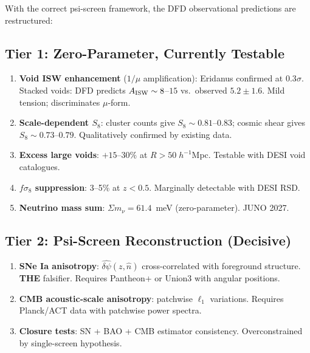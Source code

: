 \documentclass[11pt,a4paper]{article}
\newcounter{findingctr}
\newenvironment{finding}[1][]{%
  \refstepcounter{findingctr}%
  \begin{tcolorbox}[colback=blue!3!white, colframe=blue!50!black,
    title=\textbf{Finding \thefindingctr: #1}]
}{%
  \end{tcolorbox}%
}
\newcommand{\mufd}{\mu}
\begin{document}
\begin{finding}[\textbf{Revised Prediction Hierarchy}]
\label{find:strategy}

With the correct psi-screen framework, the DFD observational
predictions are restructured:

\subsection*{Tier 1: Zero-Parameter, Currently Testable}

\begin{enumerate}
\item \textbf{Void ISW enhancement} ($1/\mufd$ amplification):
  Eridanus confirmed at $0.3\sigma$.  Stacked voids: DFD predicts
  $A_{\rm ISW} \sim 8$--$15$ vs.\ observed $5.2 \pm 1.6$.
  Mild tension; discriminates $\mufd$-form.

\item \textbf{Scale-dependent $S_8$}: cluster counts give
  $S_8 \sim 0.81$--$0.83$; cosmic shear gives $S_8 \sim 0.73$--$0.79$.
  Qualitatively confirmed by existing data.

\item \textbf{Excess large voids}: $+15$--$30\%$ at $R > 50\;h^{-1}$Mpc.
  Testable with DESI void catalogues.

\item \textbf{$f\sigma_8$ suppression}: 3--5\% at $z < 0.5$.
  Marginally detectable with DESI RSD.

\item \textbf{Neutrino mass sum}: $\Sigma m_\nu = 61.4$~meV
  (zero-parameter).  JUNO 2027.
\end{enumerate}

\subsection*{Tier 2: Psi-Screen Reconstruction (Decisive)}

\begin{enumerate}
\item \textbf{SNe Ia anisotropy}: $\widehat{\delta\psi}(z,\hat n)$
  cross-correlated with foreground structure.  \textbf{THE} falsifier.
  Requires Pantheon+ or Union3 with angular positions.

\item \textbf{CMB acoustic-scale anisotropy}: patchwise $\ell_1$
  variations.  Requires Planck/ACT data with patchwise power spectra.

\item \textbf{Closure tests}: SN + BAO + CMB estimator consistency.
  Overconstrained by single-screen hypothesis.
\end{enumerate}


\end{finding}
\end{document}
